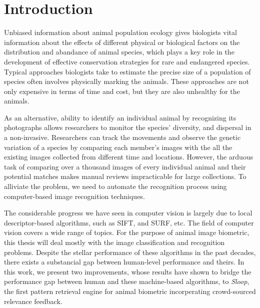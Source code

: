 
\chapter{Introduction}

Unbiased information about animal population ecology gives biologists vital information about the effects of different physical or biological factors on the distribution and abandance of animal species, which plays a key role in the development of effective conservation strategies for rare and endangered species. Typical approaches biologists take to estimate the precise size of a population of species often involves physically marking the animals. These approaches are not only expensive in terms of time and cost, but they are also unhealthy for the animals.

As an alternative, ability to identify an individual animal by recognizing its photographs allows researchers to monitor the species' diversity, and dispersal in a non-invasive. Researchers can track the movements and observe the genetic variation of a species by comparing each member's images with the all the existing images collected from different time and locations. However, the arduous task of comparing over a thousand images of every individual animal and their potential matches makes manual reviews impracticable for large collections. To alliviate the problem, we need to automate the recognition process using computer-based image recognition techniques.

The considerable progress we have seen in computer vision is largely due to local descriptor-based algorithms, such as SIFT\cite{lowe04}, and SURF\cite{surf08}, etc. The field of computer vision covers a wide range of topics. For the purpose of animal image biometric, this thesis will deal mostly with the image classification and recognition problems. Despite the stellar performance of these algorithms in the past decades, there exists a substancial gap between human-level performance and theirs. In this work, we present two improvements, whose results have shown to bridge the performance gap between human and these machine-based algorithms, to \emph{Sloop}, the first pattern retrieval engine for animal biometric incorperating crowd-sourced relevance feedback.

